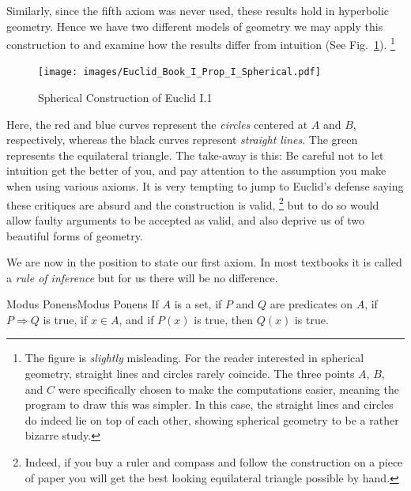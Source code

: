         Similarly, since the fifth axiom was never used, these results hold in
        hyperbolic geometry. Hence we have two different models of geometry we
        may apply this construction to and examine how the results differ from
        intuition (See Fig.~\ref{fig:Euclid_Spherical_I_I}).%
        \footnote{%
            The figure is \textit{slightly} misleading. For the reader
            interested in spherical geometry, straight lines and circles rarely
            coincide. The three points $A$, $B$, and $C$ were specifically
            chosen to make the computations easier, meaning the program to draw
            this was simpler. In this case, the straight lines and circles do
            indeed lie on top of each other, showing spherical geometry to be a
            rather bizarre study.
        }
        \begin{figure}[H]
            \centering
            \captionsetup{type=figure}
            \texttt{[image: images/Euclid\_Book\_I\_Prop\_I\_Spherical.pdf]}
            \caption{Spherical Construction of Euclid I.1}
            \label{fig:Euclid_Spherical_I_I}
        \end{figure}
        Here, the red and blue curves represent the \textit{circles} centered at
        $A$ and $B$, respectively, whereas the black curves represent
        \textit{straight lines}. The green represents the equilateral triangle.
        The take-away is this: Be careful not to let intuition get the better of
        you, and pay attention to the assumption you make when using various
        axioms. It is very tempting to jump to Euclid's defense saying these
        critiques are absurd and the construction is valid,%
        \footnote{%
            Indeed, if you buy a ruler and compass and follow the construction
            on a piece of paper you will get the best looking equilateral
            triangle possible by hand.
        }
        but to do so would allow faulty arguments to be accepted as valid, and
        also deprive us of two beautiful forms of geometry.
        \par\hfill\par
        We are now in the position to state our first axiom. In most textbooks
        it is called a \textit{rule of inference} but for us there will be no
        difference.
        \begin{faxiom}{Modus Ponens}{Modus Ponens}
            If $A$ is a set, if $P$ and $Q$ are predicates on $A$, if
            $P\Rightarrow{Q}$ is true, if $x\in{A}$, and if $P(x)$ is
            true, then $Q(x)$ is true.
        \end{faxiom}
